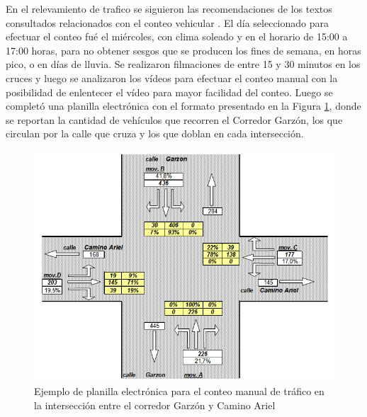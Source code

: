 En el relevamiento de trafico se siguieron las recomendaciones de los textos consultados relacionados con el conteo vehicular \citep{ConteoTrafico}. El día seleccionado para efectuar el conteo fué el miércoles, con clima soleado y en el horario de 15:00 a 17:00 horas, para no obtener sesgos que se producen los fines de semana, en horas pico, o en días de lluvia. Se realizaron filmaciones de entre 15 y 30 minutos en los cruces y luego se analizaron los vídeos para efectuar el conteo manual con la posibilidad de enlentecer el vídeo para mayor facilidad del conteo. Luego se completó una planilla electrónica con el formato presentado en la Figura \ref{fig:conteo_hoja}, donde se reportan la cantidad de vehículos que recorren el Corredor Garzón, los que circulan por la calle que cruza y los que doblan en cada intersección. 

\begin{figure}[H]
	\centering
	\includegraphics[width=0.9\linewidth]{Figures/conteo_hoja}
	\caption[Ejemplo de planilla electrónica para el conteo manual de tráfico.]{Ejemplo de planilla electrónica para el conteo manual de tráfico en la intersección entre el corredor Garzón y Camino Ariel}
	\label{fig:conteo_hoja}
\end{figure}




